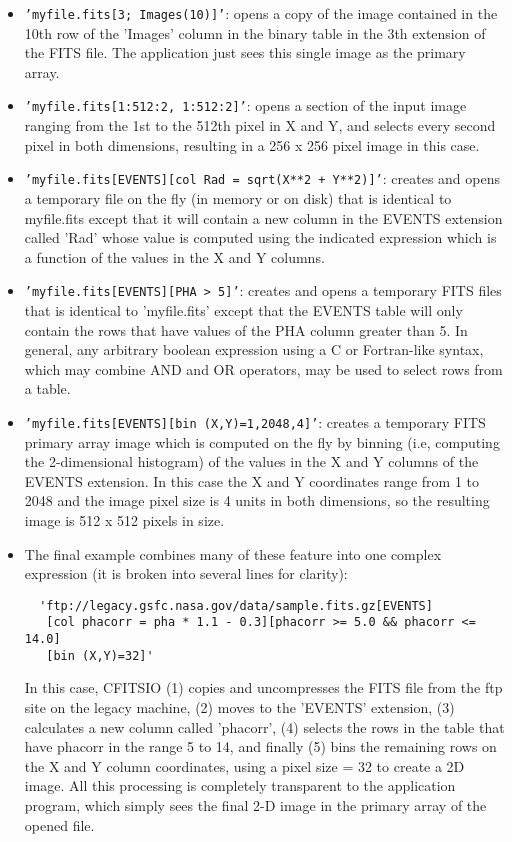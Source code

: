 \documentclass[11pt]{book}
\begin{document}
\begin{itemize}
\item
{\tt 'myfile.fits[3; Images(10)]'}: opens a copy of the image contained in the
10th row of the 'Images' column in the binary table in the 3th extension
of the FITS file.  The application just sees this single image as the
primary array.

\item
{\tt 'myfile.fits[1:512:2, 1:512:2]'}: opens a section of the input image
ranging from the 1st to the 512th pixel in  X and Y, and selects every
second pixel in both dimensions, resulting in a 256 x 256 pixel image
in this case.

\item
{\tt 'myfile.fits[EVENTS][col Rad = sqrt(X**2 + Y**2)]'}:  creates and opens
a temporary file on the fly (in memory or on disk) that is identical to
myfile.fits except that it will contain a new column in the EVENTS
extension called 'Rad' whose value is computed using the indicated
expression which is a function of the values in the X and Y columns.

\item
{\tt 'myfile.fits[EVENTS][PHA > 5]'}:  creates and opens a temporary FITS
files that is identical to 'myfile.fits' except that the EVENTS table
will only contain the rows that have values of the PHA column greater
than 5.  In general, any arbitrary boolean expression using a C or
Fortran-like syntax, which may combine AND and OR operators,
may be used to select rows from a table.

\item
{\tt 'myfile.fits[EVENTS][bin (X,Y)=1,2048,4]'}:  creates a temporary FITS
primary array image which is computed on the fly by binning (i.e,
computing the 2-dimensional histogram) of the values in the X and Y
columns of the EVENTS extension.  In this case the X and Y coordinates
range from 1 to 2048 and the image pixel size is 4 units in both
dimensions, so the resulting image is 512 x 512 pixels in size.

\item
The final example combines many of these feature into one complex
expression (it is broken into several lines for clarity):

\begin{verbatim}
  'ftp://legacy.gsfc.nasa.gov/data/sample.fits.gz[EVENTS]
   [col phacorr = pha * 1.1 - 0.3][phacorr >= 5.0 && phacorr <= 14.0]
   [bin (X,Y)=32]'
\end{verbatim}
In this case, CFITSIO (1) copies and uncompresses the FITS file from
the ftp site on the legacy machine, (2) moves to the 'EVENTS'
extension, (3) calculates a new column called 'phacorr', (4) selects
the rows in the table that have phacorr in the range 5 to 14, and
finally (5) bins the remaining rows on the X and Y column coordinates,
using a pixel size = 32 to create a 2D image.  All this processing is
completely transparent to the application program, which simply sees
the final 2-D image in the primary array of the opened file.
\end{itemize}
\end{document}

